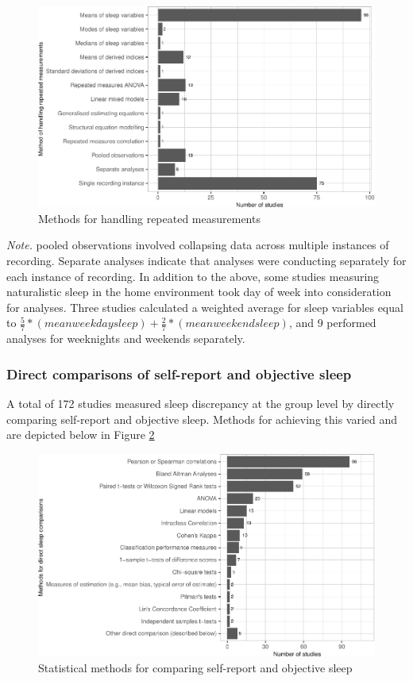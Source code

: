 \documentclass[
]{article}
\begin{document}
\begin{figure}
\centering
\includegraphics{review_markdown_files/figure-latex/methodrm-1.pdf}
\caption{\label{fig:methodrm}Methods for handling repeated measurements}
\end{figure}

\emph{Note.} pooled observations involved collapsing data across multiple instances of recording. Separate analyses indicate that analyses were conducting separately for each instance of recording. In addition to the above, some studies measuring naturalistic sleep in the home environment took day of week into consideration for analyses. Three studies calculated a weighted average for sleep variables equal to \(\frac{5}{7}* (mean weekday sleep) + \frac{2}{7}* (mean weekend sleep)\), and 9 performed analyses for weeknights and weekends separately.

\subsubsection{Direct comparisons of self-report and objective sleep}\label{direct-comparisons-of-self-report-and-objective-sleep}

A total of 172 studies measured sleep discrepancy at the group level by directly comparing self-report and objective sleep. Methods for achieving this varied and are depicted below in Figure \ref{fig:group}

\begin{figure}
\centering
\includegraphics{review_markdown_files/figure-latex/group-1.pdf}
\caption{\label{fig:group}Statistical methods for comparing self-report and objective sleep}
\end{figure}
\end{document}
